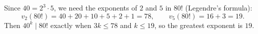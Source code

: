 Since $40=2^3\cdot5$, we need the exponents of $2$ and $5$ in $80!$ (Legendre's formula):
\[
v_2(80!)=40+20+10+5+2+1=78,\qquad v_5(80!)=16+3=19 .
\]
Then $40^k\mid80!$ exactly when $3k\le78$ and $k\le19$, so the greatest exponent is $\boxed{19}$.

